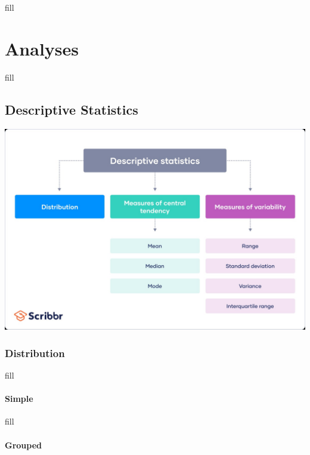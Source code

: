 \documentclass[
  b5paper]{book}
\begin{document}
fill

\hypertarget{analyses-1}{%
\chapter{Analyses}\label{analyses-1}}

fill

\hypertarget{descriptive-statistics}{%
\section{Descriptive Statistics}\label{descriptive-statistics}}

\href{Descriptive\%20Stats\%20Graphic}{\includegraphics[width=1\textwidth,height=\textheight]{images/desc_stats.jpg}}

\hypertarget{distribution-1}{%
\subsection*{Distribution}\label{distribution-1}}

fill

\hypertarget{simple}{%
\subsubsection*{Simple}\label{simple}}

fill

\hypertarget{grouped}{%
\subsubsection*{Grouped}\label{grouped}}
\end{document}
